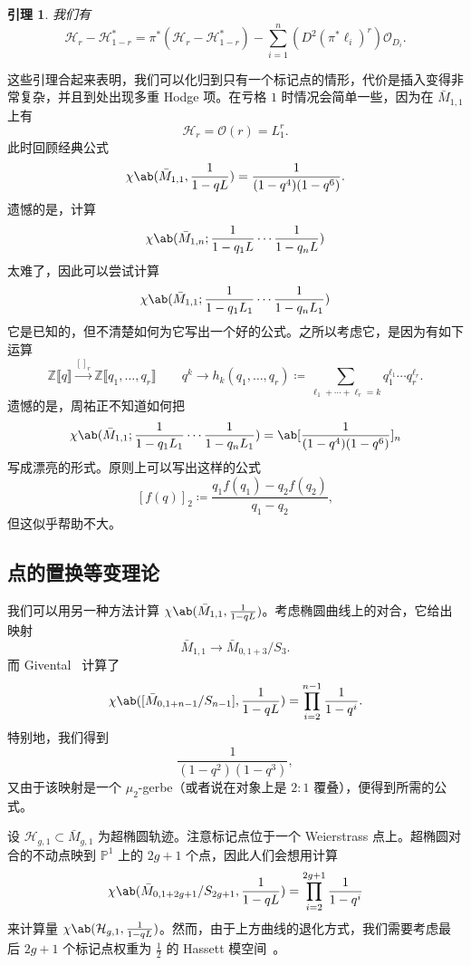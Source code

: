 \documentclass{amsart}
\newtheorem{lem}[thm]{引理}
\theoremstyle{definition}
\theoremstyle{remark}
\theoremstyle{plain}
\theoremstyle{definition}
\theoremstyle{remark}
\newcommand{\Z}{\mathbb{Z}}
\renewcommand{\P}{\mathbb{P}}
\newcommand{\mc}[1]{\mathcal{#1}}
\newcommand{\1}{\mathbf{1}}
\newcommand{\2}{\mathbf{2}}
\newcommand{\3}{\mathbf{3}}
\newcommand{\ps}[1]{\llbracket #1 \rrbracket}
\begin{document}
\begin{lem}
    我们有
    \[ \mc{H}_r - \mc{H}_{1-r}^* = \pi^* (\mc{H}_r - \mc{H}_{1-r}^*) - \sum_{i=1}^n (D^2 (\pi^* \ell_i)^r) \mc{O}_{D_i}. \]
\end{lem}

这些引理合起来表明，我们可以化归到只有一个标记点的情形，代价是插入变得非常复杂，并且到处出现多重 Hodge 项。在亏格 \(1\) 时情况会简单一些，因为在 \(\bar{M}_{1,1}\) 上有
\[ \mc{H}_r = \mc{O}(r) = L_1^r. \]
此时回顾经典公式
\[ \chi\ab(\bar{M}_{1,1}, \frac{1}{1-qL}) = \frac{1}{(1-q^4)(1-q^6)}. \]
遗憾的是，计算
\[ \chi\ab(\bar{M}_{1,n}; \frac{1}{1-q_1 L} \cdots \frac{1}{1-q_n L}) \]
太难了，因此可以尝试计算
\[ \chi\ab(\bar{M}_{1,1}; \frac{1}{1-q_1 L_1} \cdots \frac{1}{1-q_n L_1})  \]
它是已知的，但不清楚如何为它写出一个好的公式。之所以考虑它，是因为有如下运算
\[ \Z\ps{q} \xrightarrow{[]_r} \Z\ps{q_1, \ldots, q_r} \qquad q^k \to h_k(q_1, \ldots, q_r) \coloneqq \sum_{\ell_1 + \cdots + \ell_r = k} q_1^{\ell_1} \cdots q_r^{\ell_r}. \]
遗憾的是，周祐正不知道如何把
\[ \chi\ab(\bar{M}_{1,1}; \frac{1}{1-q_1 L_1} \cdots \frac{1}{1-q_n L_1}) = \ab[\frac{1}{(1-q^4)(1-q^6)}]_n \]
写成漂亮的形式。原则上可以写出这样的公式
\[ [f(q)]_2 \coloneqq \frac{q_1 f(q_1) - q_2 f(q_2)}{q_1 - q_2}, \]
但这似乎帮助不大。

\subsection{点的置换等变理论}%
\label{sub:Permutation-equivariant theory of a point}

我们可以用另一种方法计算 \(\chi\ab(\bar{M}_{1,1}, \frac{1}{1-q L})\)。考虑椭圆曲线上的对合，它给出映射
\[ \bar{M}_{1,1} \to \bar{M}_{0,1+3}/S_3. \]
而 Givental~\cite{Givental2017K1} 计算了
\[ \chi\ab([\bar{M}_{0,1+n-1}/S_{n-1}], \frac{1}{1-qL}) = \prod_{i=2}^{n-1} \frac{1}{1-q^i}. \]
特别地，我们得到
\[ \frac{1}{(1-q^2)(1-q^3)}, \]
又由于该映射是一个 \(\mu_2\)-gerbe（或者说在对象上是 \(2:1\) 覆叠），便得到所需的公式。

设 \(\mc{H}_{g,1} \subset \bar{M}_{g,1}\) 为超椭圆轨迹。注意标记点位于一个 Weierstrass 点上。超椭圆对合的不动点映到 \(\P^1\) 上的 \(2g+1\) 个点，因此人们会想用计算
\[ \chi\ab(\bar{M}_{0,1+2g+1}/S_{2g+1}, \frac{1}{1-q L}) = \prod_{i=2}^{2g+1} \frac{1}{1-q^i} \]
来计算量
\(\chi\ab(\mc{H}_{g,1}, \frac{1}{1-qL})\)。然而，由于上方曲线的退化方式，我们需要考虑最后 \(2g+1\) 个标记点权重为 \(\frac{1}{2}\) 的 Hassett 模空间~\cite{Hassett2003}。
 
\end{document}
